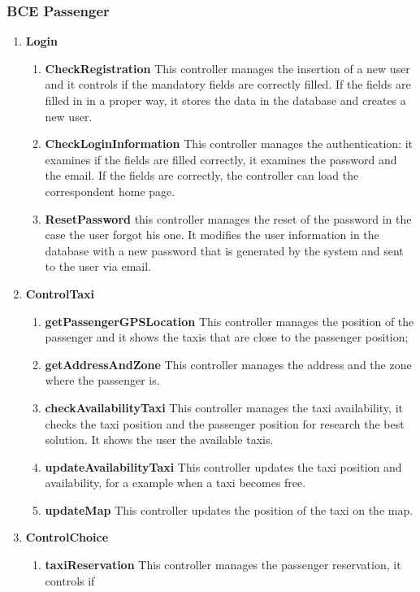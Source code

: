 \documentclass[11pt, a4paper,titlepage]{article}
\begin{document}
\subsubsection{BCE Passenger}
\begin{enumerate}	
	\item \textbf{Login}
	\begin{enumerate}
		\item \textbf{CheckRegistration} This controller manages the insertion of a new user and it controls if the mandatory fields are correctly filled.
		If the fields are filled in in a proper way, it stores the data in the database and creates a new user.  
		\item \textbf{CheckLoginInformation} This controller manages the authentication: it  
		examines if the fields are filled correctly, it examines the password and the email. 
		If the fields are correctly, the controller can load the correspondent home page.
		\item \textbf{ResetPassword} this controller manages the reset of the password in the case the user forgot his one.
		It modifies the user information in the database with a new password that is generated by the system and sent to the user via email.
	\end{enumerate}
	\item \textbf{ControlTaxi}
	\begin{enumerate}
		\item \textbf{getPassengerGPSLocation} This controller manages the position of the passenger  
		and it shows the taxis that are close to the passenger position;
		\item \textbf{getAddressAndZone} This controller manages the address and the zone where the passenger is.
		\item \textbf{checkAvailabilityTaxi} This controller manages the taxi availability, it checks the taxi position and the passenger position for research the best solution.
		It shows the user the available taxis.
		\item \textbf{updateAvailabilityTaxi} This controller updates the taxi position and 
		availability, for a example when a taxi becomes free.
		\item \textbf{updateMap} This controller updates the position of the taxi on the map.
	\end{enumerate}
	\item \textbf{ControlChoice}
	\begin{enumerate}
		\item \textbf{taxiReservation} This controller manages the passenger reservation, it controls if 

\end{enumerate}
\end{enumerate}
\end{document}
